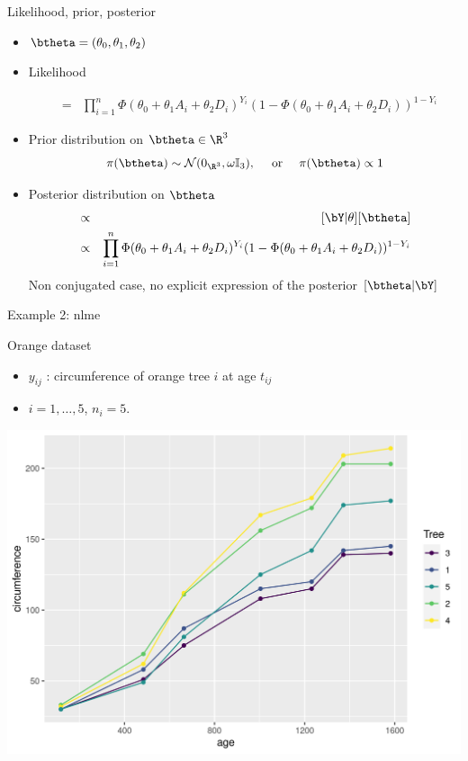 \begin{frame}{Likelihood, prior, posterior}
  \begin{itemize}
   \item $\btheta=(\theta_0,\theta_1,\theta_2)$
 \item \vert  Likelihood \noir
 
 \begin{eqnarray*}
 [\bY | \btheta] &=& \prod_{i=1}^n \Phi(\theta_0 + \theta_1 A_i + \theta_2 D_i)^{Y_i} (1- \Phi(\theta_0 + \theta_1 A_i + \theta_2 D_i))^{1-Y_i} 
 \end{eqnarray*}
 \item \vert Prior distribution on  $\btheta \in \R^3$\noir
 $$\pi(\btheta)  \sim \mathcal{N}(0_{\R^3}, \omega \mathbb{I}_3), \quad \mbox{ or } \quad \pi(\btheta) \propto 1$$
 
 
  \item \vert Posterior distribution on $\btheta$\noir
\begin{eqnarray*} 
[\btheta | \bY] &\propto&  [\bY | \theta] [\btheta] \\
 &\propto& \prod_{i=1}^n \Phi(\theta_0 + \theta_1 A_i + \theta_2 D_i)^{Y_i} (1- \Phi(\theta_0 + \theta_1 A_i + \theta_2 D_i))^{1-Y_i}
\end{eqnarray*}
 \centering
 \vert Non conjugated case, no  explicit expression of the posterior $[\btheta | \bY]$
 \end{itemize}
 \end{frame}
 
\begin{frame}{Example 2: nlme}
 
 Orange dataset
\begin{itemize}
 \item $y_{ij}$ : circumference of orange tree $i$ at age $t_{ij}$
 \item $i = 1,\dots,5$, $n_{i}=5$.
\end{itemize}

\centering
 \includegraphics[width = 0.7 \linewidth]{figures/OrangeData.png}
 \end{frame}

